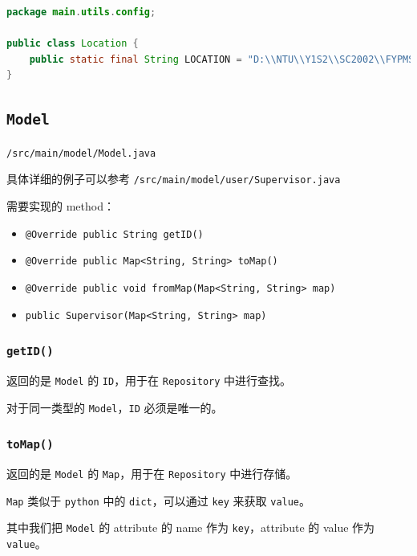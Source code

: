 \documentclass[hyperref,UTF8,12pt,a4paper]{ctexart}
\begin{document}
\begin{lstlisting}[language=Java]
package main.utils.config;

public class Location {
    public static final String LOCATION = "D:\\NTU\\Y1S2\\SC2002\\FYPMS";
}
\end{lstlisting}

\subsection{\texttt{Model}}

\texttt{/src/main/model/Model.java}

具体详细的例子可以参考 \texttt{/src/main/model/user/Supervisor.java}

需要实现的 method：

\begin{itemize}
	\item \texttt{@Override public String getID()}
	\item \texttt{@Override public Map<String, String> toMap()}
	\item \texttt{@Override public void fromMap(Map<String, String> map)}
	\item \texttt{public Supervisor(Map<String, String> map)}
\end{itemize}

\subsubsection{\texttt{getID()}}

返回的是 \texttt{Model} 的 \texttt{ID}，用于在 \texttt{Repository} 中进行查找。

对于同一类型的 \texttt{Model}，\texttt{ID} 必须是唯一的。

\subsubsection{\texttt{toMap()}}

返回的是 \texttt{Model} 的 \texttt{Map}，用于在 \texttt{Repository} 中进行存储。

\texttt{Map} 类似于 \texttt{python} 中的 \texttt{dict}，可以通过 \texttt{key} 来获取 \texttt{value}。

其中我们把 \texttt{Model} 的 attribute 的 name 作为 \texttt{key}，attribute 的 value 作为 \texttt{value}。
\end{document}
